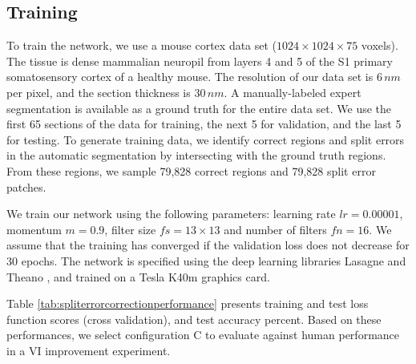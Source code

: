 \subsection{Training}
To train the network, we use a mouse cortex data set ($1024\times1024\times75$ voxels). The tissue is dense mammalian neuropil from layers 4 and 5 of the S1 primary somatosensory cortex of a healthy mouse. The resolution of our data set is $6\, nm$ per pixel, and the section thickness is $30\, nm$. 
A manually-labeled expert segmentation is available as a ground truth for the entire data set. We use the first 65 sections of the data for training, the next 5 for validation, and the last 5 for testing. To generate training data, we identify correct regions and split errors in the automatic segmentation by intersecting with the ground truth regions. From these regions, we sample 79,828 correct regions and 79,828 split error patches. 
%

We train our network using the following parameters: learning rate \mbox{$lr=0.00001$}, momentum $m=0.9$, filter size $fs=13\times13$ and number of filters $fn=16$. We assume that the training has converged if the validation loss does not decrease for 30 epochs. The network is specified using the deep learning libraries Lasagne and Theano \cite{Bastien-Theano-2012}, and trained on a Tesla K40m graphics card.

Table \ref{tab:spliterrorcorrectionperformance} presents training and test loss function scores (cross validation), and test accuracy percent. Based on these performances, we select configuration C to evaluate against human performance in a VI improvement experiment.

